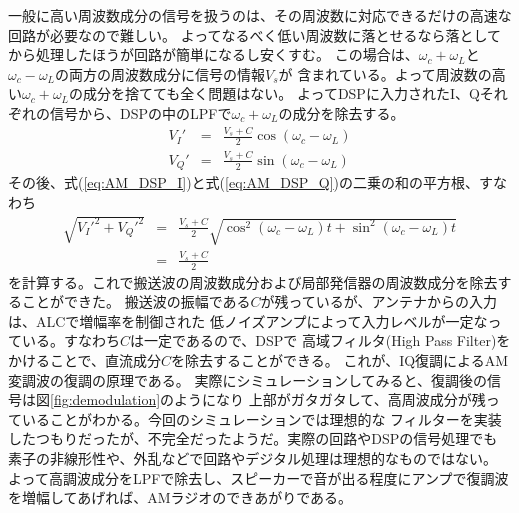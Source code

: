 一般に高い周波数成分の信号を扱うのは、その周波数に対応できるだけの高速な回路が必要なので難しい。
よってなるべく低い周波数に落とせるなら落としてから処理したほうが回路が簡単になるし安くすむ。
この場合は、$\omega_c + \omega_L$と$\omega_c - \omega_L$の両方の周波数成分に信号の情報$V_s$が
含まれている。よって周波数の高い$\omega_c + \omega_L$の成分を捨てても全く問題はない。
よってDSPに入力されたI、Qそれぞれの信号から、DSPの中のLPFで$\omega_c + \omega_L$の成分を除去する。
\begin{eqnarray}
V_I' &=& \frac{V_s+C}{2}\cos(\omega_c - \omega_L) \label{eq:AM_DSP_I}\\
V_Q' &=& \frac{V_s+C}{2}\sin(\omega_c - \omega_L) \label{eq:AM_DSP_Q}
\end{eqnarray}
その後、式(\ref{eq:AM_DSP_I})と式(\ref{eq:AM_DSP_Q})の二乗の和の平方根、すなわち
\begin{eqnarray}
\sqrt{V_I'^2 + V_Q'^2} &=& \frac{V_s+C}{2}\sqrt{\cos^2(\omega_c - \omega_L)t + \sin^2(\omega_c - \omega_L)t }\\
&=& \frac{V_s+C}{2} 
\end{eqnarray}
を計算する。これで搬送波の周波数成分および局部発信器の周波数成分を除去することができた。
搬送波の振幅である$C$が残っているが、アンテナからの入力は、ALCで増幅率を制御された
低ノイズアンプによって入力レベルが一定なっている。すなわち$C$は一定であるので、DSPで
高域フィルタ(High Pass Filter)をかけることで、直流成分$C$を除去することができる。
これが、IQ復調によるAM変調波の復調の原理である。
実際にシミュレーションしてみると、復調後の信号は図\ref{fig:demodulation}のようになり
上部がガタガタして、高周波成分が残っていることがわかる。今回のシミュレーションでは理想的な
フィルターを実装したつもりだったが、不完全だったようだ。実際の回路やDSPの信号処理でも
素子の非線形性や、外乱などで回路やデジタル処理は理想的なものではない。
よって高調波成分をLPFで除去し、スピーカーで音が出る程度にアンプで復調波を増幅してあげれば、AMラジオのできあがりである。
